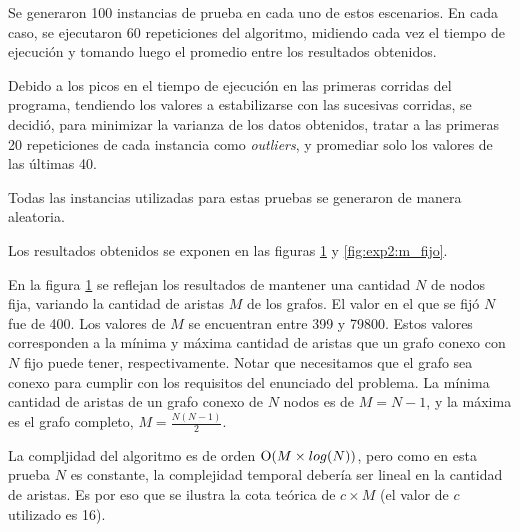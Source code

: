     Se generaron 100 instancias de prueba en cada uno de estos escenarios. En cada caso, se ejecutaron 60 repeticiones del algoritmo, midiendo cada vez el tiempo de ejecución y tomando luego el promedio entre los resultados obtenidos.

    Debido a los picos en el tiempo de ejecución en las primeras corridas del programa, tendiendo los valores a estabilizarse con las sucesivas corridas, se decidió, para minimizar la varianza de los datos obtenidos, tratar a las primeras 20 repeticiones de cada instancia como \textit{outliers}, y promediar solo los valores de las últimas 40.

    Todas las instancias utilizadas para estas pruebas se generaron de manera aleatoria. 

    Los resultados obtenidos se exponen en las figuras \ref{fig:exp2:n_fijo} y \ref{fig:exp2:m_fijo}.
    
    \newcommand\constante{16}

    En la figura \ref{fig:exp2:n_fijo} se reflejan los resultados de mantener una cantidad $N$ de nodos fija, variando la cantidad de aristas $M$ de los grafos. El valor en el que se fijó $N$ fue de 400. Los valores de $M$ se encuentran entre 399 y 79800. Estos valores corresponden a la mínima y máxima cantidad de aristas que un grafo conexo con $N$ fijo puede tener, respectivamente. Notar que necesitamos que el grafo sea conexo para cumplir con los requisitos del enunciado del problema. La mínima cantidad de aristas de un grafo conexo de $N$ nodos es de $M = N - 1$, y la máxima es el grafo completo, $M = \frac{N(N - 1)}{2}$.

    La compljidad del algoritmo es de orden $\operatorname{O}(M \times log(N))$, pero como en esta prueba $N$ es constante, la complejidad temporal debería ser lineal en la cantidad de aristas. Es por eso que se ilustra la cota teórica de $c \times M$ (el valor de $c$ utilizado es \constante). 

    \begin{figure}[H]
        \centering
        \caption{}
        \label{fig:exp2:n_fijo}
    \end{figure}

